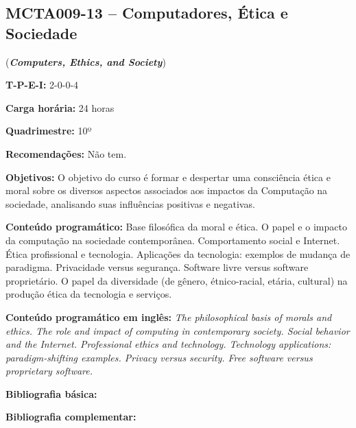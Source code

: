 \documentclass[class=article, crop=false]{standalone}
\begin{document}
\subsection*{MCTA009-13 -- Computadores, Ética e Sociedade}
\label{disc:ces}

(\textbf{\textit{Computers, Ethics, and Society}})

\begin{center}
    \begin{minipage}{0.85\textwidth}
        \textbf{T-P-E-I:} 2-0-0-4
        
        \textbf{Carga horária:} 24 horas
        
        \textbf{Quadrimestre:} 10º
        
        \textbf{Recomendações:} Não tem.
    \end{minipage}
\end{center}

\textbf{Objetivos:}
O objetivo do curso é formar e despertar uma consciência ética e moral sobre os
diversos aspectos associados aos impactos da Computação na sociedade,
analisando suas influências positivas e negativas.

\textbf{Conteúdo programático:}
Base filosófica da moral e ética.
O papel e o impacto da computação na sociedade contemporânea.
Comportamento social e Internet.
Ética profissional e tecnologia.
Aplicações da tecnologia: exemplos de mudança de paradigma.
Privacidade versus segurança.
Software livre versus software proprietário.
O papel da diversidade (de gênero, étnico-racial, etária, cultural) na produção ética da tecnologia e serviços.

\textbf{Conteúdo programático em inglês:}
\textit{The philosophical basis of morals and ethics.
The role and impact of computing in contemporary society. 
Social behavior and the Internet. 
Professional ethics and technology. 
Technology applications: paradigm-shifting examples. 
Privacy versus security. 
Free software versus proprietary software.}

\newrefsection
\textbf{Bibliografia básica:}
\nocite{2017-vazquez, 2020-maciel-viterboa, 2020-maciel-viterbob,2020-maciel-viterboc} 
\printbibliography

\newrefsection
\textbf{Bibliografia complementar:}
\nocite{2011-dupas, 2008-masiero, 2004-lessig, 2010-levy}
\printbibliography
\end{document}
